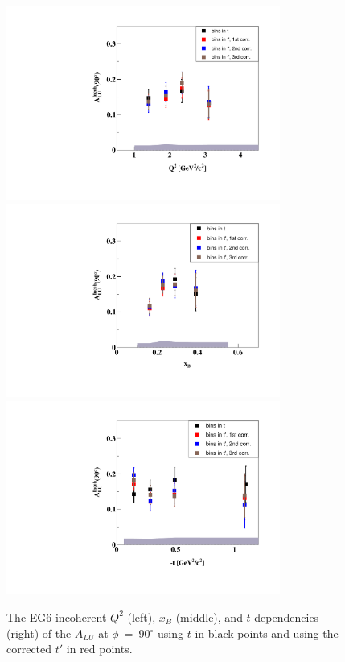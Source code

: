 \documentclass[a4paper,11pt,twoside]{article}
\begin{document}
\begin{figure}[tb]
   \centering
\includegraphics[width=9cm]{fig/t_tprime_ALU_90_p_vs_Q2_shortscenrario.pdf}
\includegraphics[width=9cm]{fig/t_tprime_ALU_90_p_vs_x_shortscenrario.pdf}
\includegraphics[width=9cm]{fig/t_tprime_ALU_90_p_vs_t_shortscenrario.pdf}
\caption{The EG6 incoherent $Q^{2}$ (left), $x_{B}$ (middle), and 
$t$-dependencies (right) of the $A_{LU}$ at $\phi$~=~90$^{\circ}$ using $t$ in 
black points and using the corrected $t'$ in red points. }
\label{fig:alu90}
\end{figure}




\end{document}
